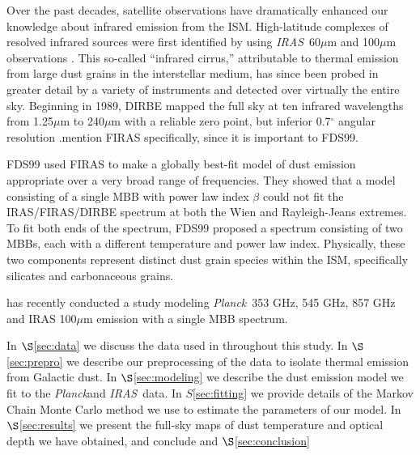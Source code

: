 \documentclass{emulateapj}
\newcommand{\IRAS}{{\it IRAS}}
\newcommand{\PLANCK}{{\it Planck}}
\begin{document}

Over the past decades, satellite observations have dramatically enhanced our
knowledge about infrared emission from the ISM. High-latitude complexes of 
resolved infrared sources were first identified by \cite{low84} using 
\IRAS~60$\mu$m and 100$\mu$m observations \citep{wheelock94}. This so-called 
``infrared cirrus,'' attributable to thermal emission from large dust grains in
the interstellar medium, has since been probed in greater detail by a variety 
of instruments and detected over virtually the entire sky. Beginning in 1989, 
DIRBE  mapped the full sky at ten infrared wavelengths from 1.25$\mu$m to 
240$\mu$m with a reliable zero point, but inferior 0.7$^{\circ}$ angular 
resolution \citep{boggess92}.mention FIRAS specifically, since it is important 
to FDS99.

FDS99 used FIRAS to make a globally best-fit model of dust emission 
appropriate over a very broad range of frequencies. They showed that a 
model consisting of a single MBB with power law index $\beta$ 
could not fit the IRAS/FIRAS/DIRBE spectrum at both the Wien and 
Rayleigh-Jeans extremes. To fit both ends of the spectrum, FDS99 proposed
a spectrum consisting of two MBBs, each with a different
temperature and power law index. Physically, these two components
represent distinct dust grain species within the ISM, specifically 
silicates and carbonaceous grains.

\cite{planckdust} has recently conducted a study modeling
\PLANCK~353 GHz, 545 GHz, 857 GHz and IRAS 100$\mu$m emission with a single
MBB spectrum. 

In $\S$\ref{sec:data} we discuss the data used in throughout this study. In 
$\S$\ref{sec:prepro} we describe our preprocessing of the data to isolate 
thermal emission from Galactic dust. In $\S$\ref{sec:modeling} we describe the 
dust emission model we fit to the \PLANCK and \IRAS~data. In 
$S$\ref{sec:fitting} we provide details of the Markov Chain Monte Carlo method 
we use to estimate the parameters of our model. In $\S$\ref{sec:results} we 
present the full-sky maps of dust temperature and optical depth we have 
obtained, and conclude and $\S$\ref{sec:conclusion}


\end{document}
